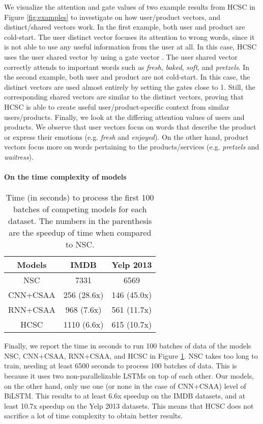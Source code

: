 \documentclass[11pt,a4paper]{article}
\begin{document}
We visualize the attention and gate values of two example results from HCSC in Figure \ref{fig:examples} to investigate on how user/product vectors, and distinct/shared vectors work.
In the first example, both user and product are cold-start. The user distinct vector focuses its attention to wrong words, since it is not able to use any useful information from the user at all. In this case, HCSC uses the user shared vector by using a gate vector . The user shared vector correctly attends to important words such as \textit{fresh}, \textit{baked}, \textit{soft}, and \textit{pretzels}.
In the second example, both user and product are not cold-start. In this case, the distinct vectors are used almost entirely by setting the gates close to 1. Still, the corresponding shared vectors are similar to the distinct vectors, proving that HCSC is able to create useful user/product-specific context from similar users/products.
Finally, we look at the differing attention values of users and products. We observe that user vectors focus on words that describe the product or express their emotions (e.g. \textit{fresh} and \textit{enjoyed}). On the other hand, product vectors focus more on words pertaining to the products/services (e.g. \textit{pretzels} and \textit{waitress}).

\paragraph{On the time complexity of models}

\begin{table}[t]
  \small
  \centering
    \begin{tabular}{|c|cc|}
    \hline
    Models & IMDB & Yelp 2013 \\
    \hline
    NSC & 7331 & 6569 \\
    \hline
    CNN+CSAA & 256 (28.6x) & 146 (45.0x) \\
    RNN+CSAA & 968 (7.6x) & 561 (11.7x) \\
    HCSC & 1110 (6.6x) & 615 (10.7x) \\
    \hline
    \end{tabular}\caption{Time (in seconds) to process the first 100 batches of competing models for each dataset. The numbers in the parenthesis are the speedup of time when compared to NSC.}
  \label{tab:time}\end{table}

Finally, we report the time in seconds to run 100 batches of data of the models NSC, CNN+CSAA, RNN+CSAA, and HCSC in Figure \ref{tab:time}. NSC takes too long to train, needing at least 6500 seconds to process 100 batches of data. This is because it uses two non-parallelizable LSTMs on top of each other. Our models, on the other hand, only use one (or none in the case of CNN+CSAA) level of BiLSTM. This results to at least 6.6x speedup on the IMDB datasets, and at least 10.7x speedup on the Yelp 2013 datasets. This means that HCSC does not sacrifice a lot of time complexity to obtain better results.
\end{document}
